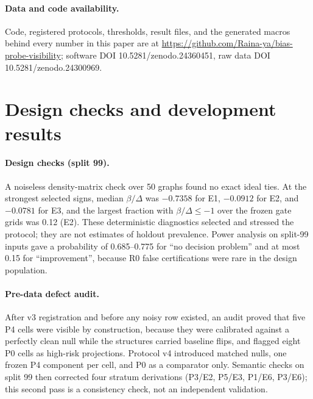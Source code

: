 \documentclass[10pt,twocolumn]{article}
\begin{document}
\paragraph{Data and code availability.} Code, registered protocols,
thresholds, result files, and the generated macros behind every number in this
paper are at \url{https://github.com/Raina-ya/bias-probe-visibility}; software
DOI 10.5281/zenodo.24360451, raw data DOI 10.5281/zenodo.24300969.




\appendix

\section{Design checks and development results}\label{app:design}

\paragraph{Design checks (split 99).} A noiseless density-matrix check over 50
graphs found no exact ideal ties. At the strongest selected signs, median
$\beta/\Delta$ was $-0.7358$ for E1, $-0.0912$ for E2, and $-0.0781$ for E3,
and the largest fraction with $\beta/\Delta\le-1$ over the frozen gate grids
was 0.12 (E2). These deterministic diagnostics selected and stressed the
protocol; they are not estimates of holdout prevalence. Power analysis on
split-99 inputs gave a probability of 0.685--0.775 for ``no decision problem''
and at most 0.15 for ``improvement'', because R0 false certifications were
rare in the design population.

\paragraph{Pre-data defect audit.} After v3 registration and before any noisy
row existed, an audit proved that five P4 cells were visible by construction,
because they were calibrated against a perfectly clean null while the
structures carried baseline flips, and flagged eight P0 cells as high-risk
projections. Protocol v4 introduced matched nulls, one frozen P4 component per
cell, and P0 as a comparator only. Semantic checks on split 99 then corrected
four stratum derivations (P3/E2, P5/E3, P1/E6, P3/E6); this second pass is a
consistency check, not an independent validation.
\end{document}

